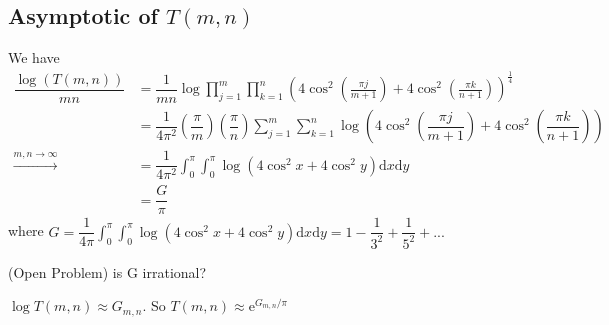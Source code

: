 \subsection{Asymptotic of \texorpdfstring{$T(m,n)$}{T(m,n)}}
We have
\begin{align*}
\dfrac{\log (T(m,n))}{mn} &= \dfrac{1}{mn} \log \prod_{j=1}^{m}\prod_{k=1}^n(4\cos^2(\frac{\pi j}{m+1})+4\cos^2(\frac{\pi k}{n+1}))^{\frac{1}{4}}\\
&=\dfrac{1}{4\pi^2}(\dfrac{\pi}{m})(\dfrac{\pi}{n})\sum\limits_{j=1}^m\sum_{k=1}^n\log (4\cos^2(\dfrac{\pi j}{m+1})+4\cos^2(\dfrac{\pi k}{n+1}))\\
\xrightarrow{m,n \rightarrow \infty}&=\dfrac{1}{4\pi^2}\int_0^{\pi}\int_0^{\pi}\log(4\cos ^2x+4\cos^2y)\mathrm{d}x \mathrm{d}y\\
&=\dfrac{G}{\pi}
\end{align*}
where $G = \dfrac{1}{4\pi}\int_0^{\pi}\int_0^{\pi}\log(4\cos ^2x+4\cos^2y)\mathrm{d}x \mathrm{d}y=1-\dfrac{1}{3^2}+\dfrac{1}{5^2}+...$

(Open Problem) is G irrational?

$\log T(m,n) \approx G_{m,n}$. So $T(m,n) \approx \mathrm{e}^{G_{m,n}/\pi}$

